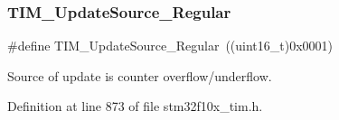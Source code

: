 \subsubsection{\texorpdfstring{T\+I\+M\+\_\+\+Update\+Source\+\_\+\+Regular}{TIM\_UpdateSource\_Regular}}
{\footnotesize\ttfamily \#define T\+I\+M\+\_\+\+Update\+Source\+\_\+\+Regular~((uint16\+\_\+t)0x0001)}

Source of update is counter overflow/underflow. 

Definition at line 873 of file stm32f10x\+\_\+tim.\+h.

